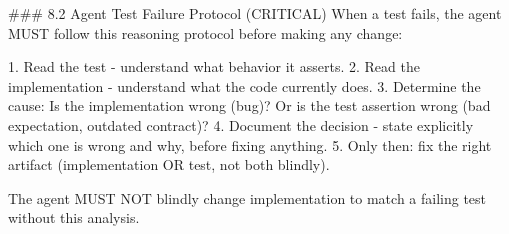 \begin{listing}[H]
\begin{center}
\begin{promptbox}
### 8.2 Agent Test Failure Protocol (CRITICAL)
When a test fails, the agent MUST follow this reasoning protocol before making any change:

1. Read the test - understand what behavior it asserts.
2. Read the implementation - understand what the code currently does.
3. Determine the cause: Is the implementation wrong (bug)? Or is the test assertion wrong (bad expectation, outdated contract)?
4. Document the decision - state explicitly which one is wrong and why, before fixing anything.
5. Only then: fix the right artifact (implementation OR test, not both blindly).

The agent MUST NOT blindly change implementation to match a failing test without this analysis.
\end{promptbox}
\end{center}
\caption{Excerpt of \texttt{AGENTS.md} defining the agent test failure protocol.}
\label{lst:test-failure-protocol}
\end{listing}

